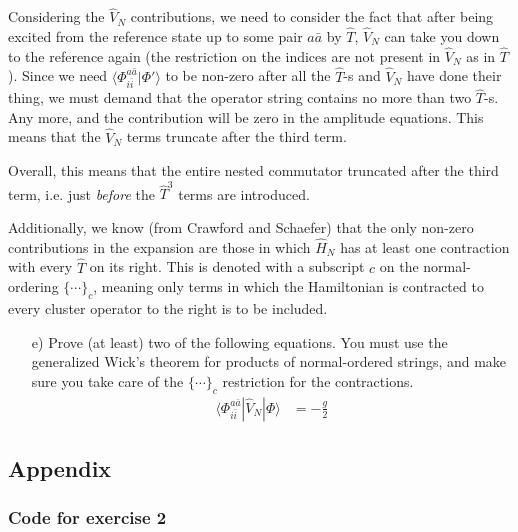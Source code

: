 \documentclass[a4paper]{article}
\begin{document}
Considering the $\hat V_N$ contributions, we need to consider the fact that after being excited from the reference state up to some pair $a\bar a$ by $\hat T$, $\hat V_N$ can take you down to the reference again (the restriction on the indices are not present in $\hat V_N$ as in $\hat T$). Since we need $\langle \Phi_{i\bar i}^{a\bar a}| \Phi'\rangle$ to be non-zero after all the $\hat T$-s and $\hat V_N$ have done their thing, we must demand that the operator string contains no more than two $\hat T$-s. Any more, and the contribution will be zero in the amplitude equations. This means that the $\hat V_N$ terms truncate after the third term.

Overall, this means that the entire nested commutator truncated after the third term, i.e. just \emph{before} the $\hat T^3$ terms are introduced. 

Additionally, we know (from Crawford and Schaefer) that the only non-zero contributions in the expansion are those in which $\hat H_N$ has at least one contraction with every $\hat T$ on its right. This is denoted with a subscript $c$ on the normal-ordering $\{\cdots\}_c$, meaning only terms in which the Hamiltonian is contracted to every cluster operator to the right is to be included.



\begin{exframe}
\begin{itemize}
  \item[e)] Prove (at least) two of the following equations. You must use the generalized Wick's theorem for products of normal-ordered strings, and make sure you take care of the $\{\cdots\}_c$ restriction for the contractions.
  \begin{align}
  \langle \Phi_{i\bar i}^{a\bar a} |\hat V_N |\Phi\rangle &= -\frac{g}{2}
  \end{align}
\end{itemize}
\end{exframe}





\newpage
\subsection*{Appendix}
\subsubsection*{Code for exercise 2}

\end{document}
